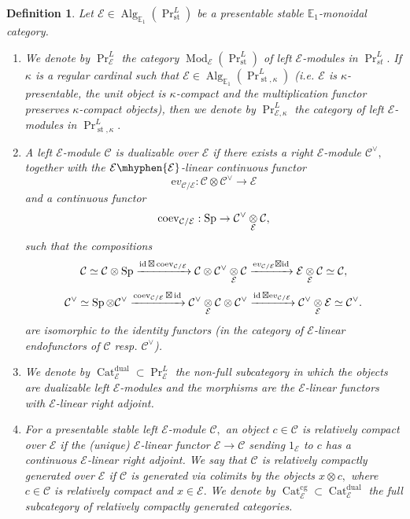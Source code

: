 \documentclass[11pt,leqno]{amsart}
\newtheorem{defi}[theo]{Definition}
\numberwithin{equation}{section}
\newcommand{\tens}[1]{%
  \mathbin{\mathop{\otimes}\displaylimits_{#1}}%
}
\newcommand{\hy}{\mhyphen}
\newcommand{\xto}{\xrightarrow}
\newcommand{\Cat}{\operatorname{Cat}}
\newcommand{\st}{\operatorname{st}}
\newcommand{\cg}{\operatorname{cg}}
\newcommand{\dual}{\operatorname{dual}}
\newcommand{\bE}{{\mathbb E}}
\newcommand{\ev}{\mathrm ev}
\newcommand{\cC}{{\mathcal C}}
\newcommand{\cE}{{\mathcal E}}
\newcommand{\Sp}{\operatorname{Sp}}
\newcommand{\Alg}{\operatorname{Alg}}
\newcommand{\id}{\operatorname{id}}
\newcommand{\coev}{\operatorname{coev}}
\newcommand{\Mod}{\operatorname{Mod}}
\begin{document}
\begin{defi}\label{def:dualizable_over_E_1_monoidal}
Let $\cE\in\Alg_{\bE_1}(\Pr^L_{\st})$ be a presentable stable $\bE_1$-monoidal category.
\begin{enumerate}[label=(\roman*), ref=(\roman*)]
\item We denote by $\Pr^L_{\cE}$ the category $\Mod_{\cE}(\Pr^L_{\st})$ of left $\cE$-modules in $\Pr^L_{st}.$ If $\kappa$ is a regular cardinal such that $\cE\in \Alg_{\bE_1}(\Pr^L_{\st,\kappa})$ (i.e. $\cE$ is $\kappa$-presentable, the unit object is $\kappa$-compact and the multiplication functor preserves $\kappa$-compact objects), then we denote by $\Pr^L_{\cE,\kappa}$ the category of left $\cE$-modules in $\Pr^L_{\st,\kappa}.$
\item A left $\cE$-module $\cC$ is dualizable over $\cE$ if there exists a right $\cE$-module $\cC^{\vee},$ together with the $\cE\hy\cE$-linear continuous functor
\begin{equation*}
\ev_{\cC/\cE}:\cC\otimes\cC^{\vee}\to \cE
\end{equation*}
and a continuous functor
\begin{equation*}
\coev_{\cC/\cE}:\Sp\to\cC^{\vee}\tens{\cE}\cC,
\end{equation*}
such that the compositions
\begin{equation*}
	\cC\simeq \cC\otimes\Sp\xto{\id\boxtimes\coev_{\cC/\cE}} \cC\otimes \cC^{\vee}\tens{\cE}\cC\xto{\ev_{\cC/\cE}\boxtimes\id}\cE\tens{\cE}\cC\simeq \cC,
\end{equation*}
\begin{equation*}
	\cC^{\vee}\simeq\Sp\otimes\cC^{\vee}\xto{\coev_{\cC/\cE}\boxtimes\id} \cC^{\vee}\tens{\cE}\cC\otimes \cC^{\vee}\xto{\id\boxtimes \ev_{\cC/\cE}}\cC^{\vee}\tens{\cE}\cE\simeq\cC^{\vee}.
\end{equation*}
are isomorphic to the identity functors (in the category of $\cE$-linear endofunctors of $\cC$ resp. $\cC^{\vee}$).
\item We denote by $\Cat_{\cE}^{\dual}\subset \Pr^L_{\cE}$ the non-full subcategory in which the objects are dualizable left $\cE$-modules and the morphisms are the $\cE$-linear functors with $\cE$-linear right adjoint.
\item For a presentable stable left $\cE$-module $\cC,$ an object $c\in\cC$ is relatively compact over $\cE$ if the (unique) $\cE$-linear functor $\cE\to\cC$ sending $1_{\cE}$ to $c$ has a continuous $\cE$-linear right adjoint. We say that $\cC$ is relatively compactly generated over $\cE$ if $\cC$ is generated via colimits by the objects $x\otimes c,$ where $c\in\cC$ is relatively compact and $x\in\cE.$ We denote by $\Cat_{\cE}^{\cg}\subset\Cat_{\cE}^{\dual}$ the full subcategory of relatively compactly generated categories.
\end{enumerate}
\end{defi}
\end{document}
